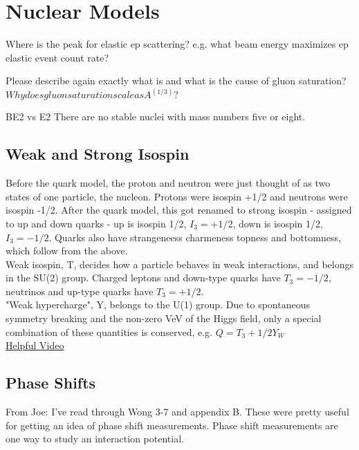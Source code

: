 \chapter{Nuclear Models}

Where is the peak for elastic ep scattering? e.g. what beam energy maximizes ep elastic event count rate?

Please describe again exactly what is and what is the cause of gluon saturation?
$Why does gluon saturation scale as A^(1/3)?$

BE2 vs E2  There are no stable nuclei with mass numbers five or eight.  

    \section{Weak and Strong Isospin}
        \indent Before the quark model, the proton and neutron were just thought of as two states of one particle, the nucleon. Protons were isospin +1/2 and neutrons were isospin -1/2. After the quark model, this got renamed to strong isospin - assigned to up and down quarks - up is isospin 1/2, $I_3 = +1/2$, down is isospin 1/2, $I_3 = -1/2$. Quarks also have strangeneess charmeness topness and bottomness, which follow from the above. \\
        \indent Weak isospin, T, decides how a particle behaves in weak interactions, and belongs in the SU(2) group. Charged leptons and down-type quarks have $T_3 = -1/2$, neutrinos and up-type quarks have $T_3 =  +1/2$. \\
        "Weak hypercharge", Y, belongs to the U(1) group. Due to spontaneous symmetry breaking and the non-zero VeV of the Higgs field, only a special combination of these quantities is conserved, e.g. $Q = T_3 + 1/2 Y_W$\\
        \href{https://www.youtube.com/watch?v=dquBZfagEmQ}{Helpful Video}

\section{Phase Shifts}
    From Joe: I've read through Wong 3-7 and appendix B.  These were pretty useful for getting an idea of phase shift measurements.  Phase shift measurements are one way to study an interaction potential.


